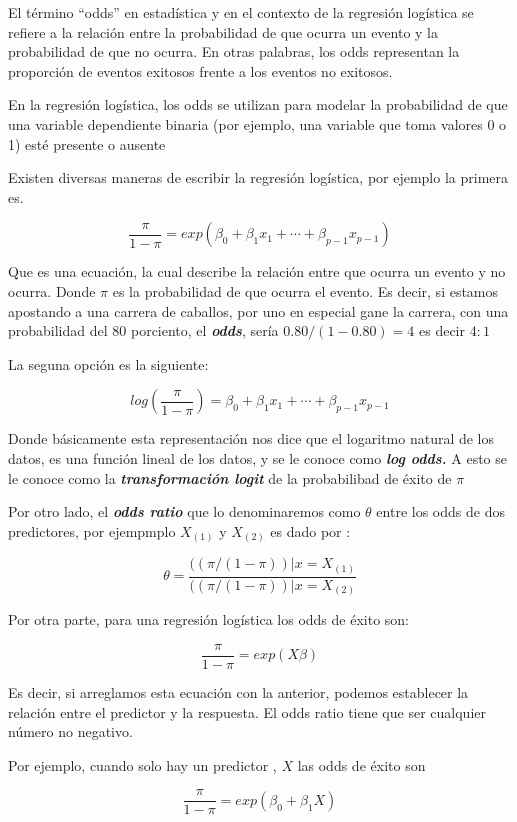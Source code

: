 \documentclass[
  letterpaper,
  DIV=11,
  numbers=noendperiod]{scrartcl}
\begin{document}
El término ``odds'' en estadística y en el contexto de la regresión
logística se refiere a la relación entre la probabilidad de que ocurra
un evento y la probabilidad de que no ocurra. En otras palabras, los
odds representan la proporción de eventos exitosos frente a los eventos
no exitosos.

En la regresión logística, los odds se utilizan para modelar la
probabilidad de que una variable dependiente binaria (por ejemplo, una
variable que toma valores 0 o 1) esté presente o ausente

Existen diversas maneras de escribir la regresión logística, por ejemplo
la primera es.

\[
\frac{\pi}{1-\pi} = exp(\beta_0+\beta_1x_1+\cdots+\beta_{p-1}x_{p-1})
\]

Que es una ecuación, la cual describe la relación entre que ocurra un
evento y no ocurra. Donde \(\pi\) es la probabilidad de que ocurra el
evento. Es decir, si estamos apostando a una carrera de caballos, por
uno en especial gane la carrera, con una probabilidad del 80 porciento,
el \textbf{\emph{odds}}, sería \(0.80/(1-0.80) = 4\) es decir \(4:1\)

La seguna opción es la siguiente:

\[
log(\frac{\pi}{1-\pi}) = \beta_0+\beta_1x_1+\cdots+\beta_{p-1}x_{p-1}
\]

Donde básicamente esta representación nos dice que el logaritmo natural
de los datos, es una función lineal de los datos, y se le conoce como
\textbf{\emph{log odds.}} A esto se le conoce como la
\textbf{\emph{transformación logit}} de la probabilibad de éxito de
\(\pi\)

Por otro lado, el \textbf{\emph{odds ratio}} que lo denominaremos como
\(\theta\) entre los odds de dos predictores, por ejempmplo \(X_{(1)}\)
y \(X_{(2)}\) es dado por :

\[
\theta=\frac{((\pi/(1-\pi))|x=X_{(1)}}{((\pi/(1-\pi))|x=X_{(2)}}
\]

Por otra parte, para una regresión logística los odds de éxito son:

\[
\frac{\pi}{1-\pi} = exp(X\beta)
\]

Es decir, si arreglamos esta ecuación con la anterior, podemos
establecer la relación entre el predictor y la respuesta. El odds ratio
tiene que ser cualquier número no negativo.

Por ejemplo, cuando solo hay un predictor , \(X\) las odds de éxito son

\[
\frac{\pi}{1-\pi} = exp(\beta_0+\beta_1X)
\]
\end{document}
